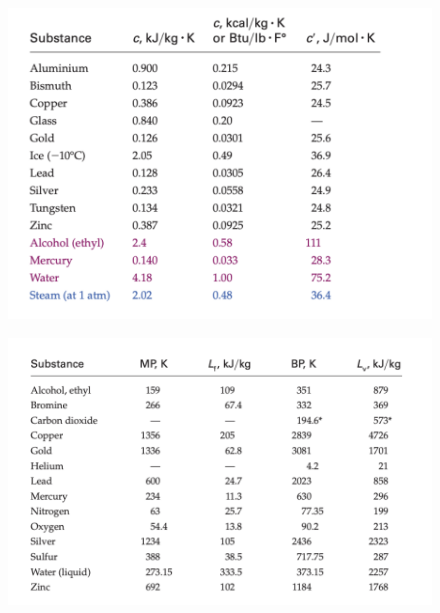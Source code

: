 \documentclass[12pt,a4paper]{article}
\begin{document}
	\begin{figure}
		\centering
		\includegraphics[width=0.7\linewidth]{latentHeat1}
		\caption{}
		\label{fig:latentheat2}
	\end{figure}
	
	\begin{figure}
		\centering
		\includegraphics[width=0.7\linewidth]{latentHeat2}
		\caption{}
		\label{fig:latentheat2}
	\end{figure}
	

	
\end{document}
